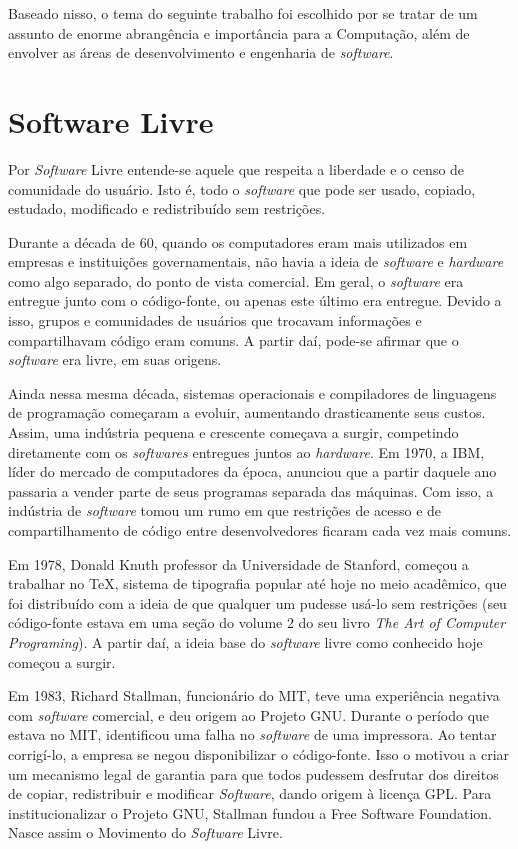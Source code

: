 \documentclass{classe_cn}                 %
\begin{document}
Baseado nisso, o tema do seguinte trabalho foi escolhido por se tratar de um assunto de enorme abrangência e importância para a Computação, além de envolver as áreas de desenvolvimento e engenharia de \textit{software}.

\section{Software Livre}

Por \textit{Software} Livre \cite{Campos:2016} entende-se aquele que respeita a liberdade e o censo de comunidade do usuário. Isto é, todo o \textit{software} que pode ser usado, copiado, estudado, modificado e redistribuído sem restrições.

Durante a década de 60, quando os computadores eram mais utilizados em empresas e instituições governamentais, não havia a ideia de \textit{software} e \textit{hardware} como algo separado, do ponto de vista comercial. Em geral, o \textit{software} era entregue junto com o código-fonte, ou apenas este último era entregue. Devido a isso, grupos e comunidades de usuários que trocavam informações e compartilhavam código eram comuns. A partir daí, pode-se afirmar que o \textit{software} era livre, em suas origens.

Ainda nessa mesma década, sistemas operacionais e compiladores de linguagens de programação começaram a evoluir, aumentando drasticamente seus custos. Assim, uma indústria pequena e crescente começava a surgir, competindo diretamente com os \textit{softwares} entregues juntos ao \textit{hardware}. Em 1970, a IBM, líder do mercado de computadores da época, anunciou que a partir daquele ano passaria a vender parte de seus programas separada das máquinas. Com isso, a indústria de \textit{software} tomou um rumo em que restrições de acesso e de compartilhamento de código entre desenvolvedores ficaram cada vez mais comuns.

Em 1978, Donald Knuth professor da Universidade de Stanford, começou a trabalhar no TeX, sistema de tipografia popular até hoje no meio acadêmico, que foi distribuído com a ideia de que qualquer um pudesse usá-lo sem restrições (seu código-fonte estava em uma seção do volume 2 do seu livro \textit{The Art of Computer Programing}). A partir daí, a ideia base do \textit{software} livre como conhecido hoje começou a surgir.

Em 1983, Richard Stallman, funcionário do MIT, teve uma experiência negativa com \textit{software} comercial, e deu origem ao Projeto GNU. Durante o período que estava no MIT, identificou uma falha no \textit{software} de uma impressora. Ao tentar corrigí-lo, a empresa se negou disponibilizar o código-fonte. Isso o motivou a criar um mecanismo legal de garantia para que todos pudessem desfrutar dos direitos de copiar, redistribuir e modificar \textit{Software}, dando origem à licença GPL. Para institucionalizar o Projeto GNU, Stallman fundou a Free Software Foundation. Nasce assim o Movimento do \textit{Software} Livre.
\end{document}
